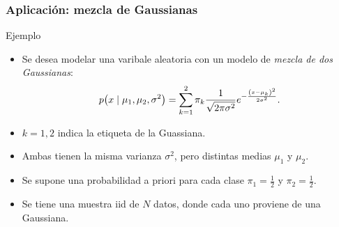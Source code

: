 \documentclass[table]{beamer}
\begin{document}
\begin{frame}
    \frametitle{Aplicación: mezcla de Gaussianas}
    \begin{exampleblock}{Ejemplo}
        \begin{itemize}
            \item Se desea modelar una varibale aleatoria con un modelo de \emph{mezcla de dos Gaussianas}:
                \begin{equation*}
                    \pdf{x \mid \mu_{1} , \mu_{2} , \sigma^{2}} = \sum_{k = 1}^{2} \pi_{k} \frac{1}{\sqrt{2 \pi \sigma^{2}}} e^{- \frac{\parens{x - \mu_{k}}^{2}}{2 \sigma^{2}}} .
                \end{equation*}
            \item $k = 1 , 2$ indica la etiqueta de la Guassiana.
            \item Ambas tienen la misma varianza $\sigma^{2}$, pero distintas medias $\mu_{1}$ y $\mu_{2}$.
            \item Se supone una probabilidad a priori para cada clase $\pi_{1} = \frac{1}{2}$ y $\pi_{2} = \frac{1}{2}$.
            \item Se tiene una muestra iid de $N$ datos, donde cada uno proviene de una Gaussiana.
        \end{itemize}
    \end{exampleblock}
\end{frame}
\end{document}
